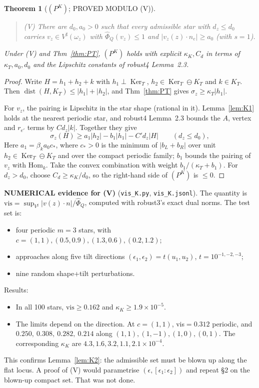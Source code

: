 \documentclass[11pt]{article}
\newtheorem{theorem}{Theorem}[section]
\theoremstyle{remark}
\begin{document}
\begin{theorem}[$(P^K)$; PROVED MODULO (V)]\label{thm:PK}
\begin{quote}
(V) There are $d_0,a_0>0$ such that every admissible star with $d_z\le d_0$ carries $v_z\in V^\sharp(\omega_z)$ with $\hat\Phi_Q(v_z)\le1$ and
$|v_z(z)\cdot n_{e}|\ge a_0$ (with $s=1$).
\end{quote}
Under (V) and Thm~\ref{thm:PT}, $(P^K)$ holds with explicit $\kappa_K,C_d$ in terms of $\kappa_T,a_0,d_0$ and the Lipschitz constants of
robust4 Lemma~2.3.
\end{theorem}
\begin{proof}
Write $H=h_1+h_2+k$ with $h_1\perp\operatorname{Ker}_T$, $h_2\in\operatorname{Ker}_T\ominus K_T$ and $k\in K_T$. Then
$\operatorname{dist}(H,K_T)\le|h_1|+|h_2|$, and Thm~\ref{thm:PT} gives $\sigma_z\ge\kappa_T|h_1|$.

For $v_z$, the pairing is Lipschitz in the star shape (rational in it). Lemma~\ref{lem:K1} holds at the nearest periodic star, and
robust4 Lemma~2.3 bounds the $A$, vertex and $r_{e'}$ terms by $Cd_z|k|$. Together they give
\[
\sigma_z(H)\ge a_1|h_2|-b_1|h_1|-C'd_z|H|\qquad(d_z\le d_0),
\]
Here $a_1=\beta_ka_0c_\ast$, where $c_\ast>0$ is the minimum of $|b_L+b_R|$ over unit $h_2\in\operatorname{Ker}_T\ominus K_T$ and over the
compact periodic family; $b_1$ bounds the pairing of $v_z$ with $\mathrm{Hom}_k$. Take the convex combination with weight $b_1/(\kappa_T+b_1)$. For $d_z>d_0$, choose $C_d\ge\kappa_K/d_0$, so the right-hand side of $(P^K)$ is $\le0$.
\end{proof}

\noindent\textbf{NUMERICAL evidence for (V)} (\texttt{vis\_K.py}, \texttt{vis\_K.jsonl}). The quantity is
$\mathrm{vis}=\sup_{V^\sharp}|v(z)\cdot n|/\hat\Phi_Q$, computed with robust3's exact dual norms. The test set is:
\begin{itemize}
\item four periodic $m=3$ stars, with $c=(1,1),(0.5,0.9),(1.3,0.6),(0.2,1.2)$;
\item approaches along five tilt directions $(\epsilon_1,\epsilon_2)=t(u_1,u_2)$, $t=10^{-1,-2,-3}$;
\item nine random shape+tilt perturbations.
\end{itemize}
Results:
\begin{itemize}
\item In all 100 stars, $\mathrm{vis}\ge0.162$ and $\kappa_K\ge1.9\times10^{-5}$.
\item The limits depend on the direction. At $c=(1,1)$, vis$=0.312$ periodic, and $0.250,\ 0.308,\ 0.282,\ 0.214$ along $(1,1),(1,-1),(1,0),(0,1)$.
 The corresponding $\kappa_K$ are $4.3,1.6,3.2,1.1,2.1\times10^{-4}$.
\end{itemize}
This confirms Lemma~\ref{lem:K2}: the admissible set must be blown up along the flat locus. A proof of (V) would parametrise
$(\epsilon,[\epsilon_1:\epsilon_2])$ and repeat \S2 on the blown-up compact set. That was not done.
\end{document}
